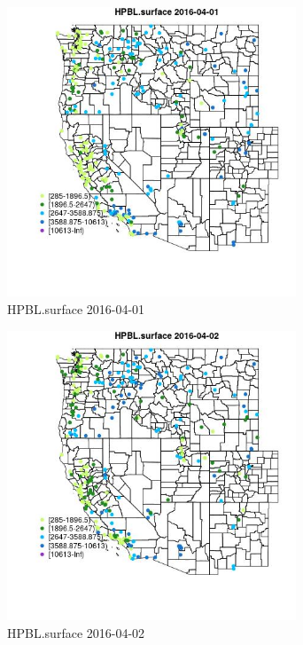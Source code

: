 \begin{figure} 
\centering  
\includegraphics[width=0.77\textwidth]{Code_Outputs/Report_ML_input_PM25_Step4_part_e_de_duplicated_aveswNAs_MapObsHPBLsurface2016-04-01.jpg} 
\caption{\label{fig:Report_ML_input_PM25_Step4_part_e_de_duplicated_aveswNAsMapObsHPBLsurface2016-04-01}HPBL.surface 2016-04-01} 
\end{figure} 
 

\begin{figure} 
\centering  
\includegraphics[width=0.77\textwidth]{Code_Outputs/Report_ML_input_PM25_Step4_part_e_de_duplicated_aveswNAs_MapObsHPBLsurface2016-04-02.jpg} 
\caption{\label{fig:Report_ML_input_PM25_Step4_part_e_de_duplicated_aveswNAsMapObsHPBLsurface2016-04-02}HPBL.surface 2016-04-02} 
\end{figure} 
 

